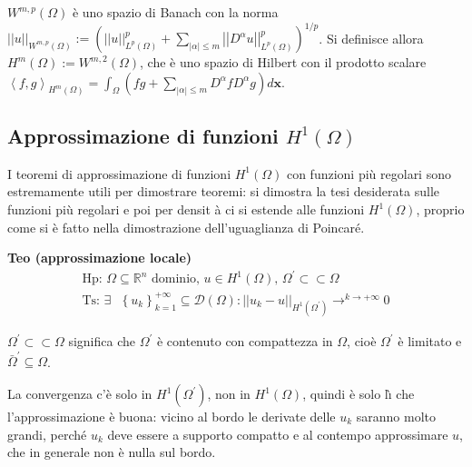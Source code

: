 \documentclass{article}
\begin{document}
$W^{m,p}\left( \Omega \right) $ \`{e} uno spazio di Banach con la norma $%
\left\vert \left\vert u\right\vert \right\vert _{W^{m,p}\left( \Omega
\right) }:=\left( \left\vert \left\vert u\right\vert \right\vert
_{L^{p}\left( \Omega \right) }^{p}+\sum_{\left\vert \alpha \right\vert \leq
m}\left\vert \left\vert D^{\alpha }u\right\vert \right\vert _{L^{p}\left(
\Omega \right) }^{p}\right) ^{1/p}$. Si definisce allora $H^{m}\left( \Omega
\right) :=W^{m,2}\left( \Omega \right) $, che \`{e} uno spazio di Hilbert
con il prodotto scalare $\left\langle f,g\right\rangle _{H^{m}\left( \Omega
\right) }=\int_{\Omega }\left( fg+\sum_{\left\vert \alpha \right\vert \leq
m}D^{\alpha }fD^{\alpha }g\right) d\mathbf{x}$.

\subsection{Approssimazione di funzioni $H^{1}\left( \Omega \right) $}

I teoremi di approssimazione di funzioni $H^{1}\left( \Omega \right) $ con
funzioni pi\`{u} regolari sono estremamente utili per dimostrare teoremi: si
dimostra la tesi desiderata sulle funzioni pi\`{u} regolari e poi per densit%
\`{a} ci si estende alle funzioni $H^{1}\left( \Omega \right) $, proprio
come si \`{e} fatto nella dimostrazione dell'uguaglianza di Poincar\'{e}.

\textbf{Teo (approssimazione locale)}%
\begin{gather*}
\text{Hp}\text{: }\Omega \subseteq 
\mathbb{R}
^{n}\text{ dominio, }u\in H^{1}\left( \Omega \right) \text{, }\Omega
^{\prime }\subset \subset \Omega \\
\text{Ts}\text{: }\exists \text{ }\left\{ u_{k}\right\} _{k=1}^{+\infty
}\subseteq \mathcal{D}\left( \Omega \right) :\left\vert \left\vert
u_{k}-u\right\vert \right\vert _{H^{1}\left( \Omega ^{\prime }\right)
}\rightarrow ^{k\rightarrow +\infty }0
\end{gather*}

$\Omega ^{\prime }\subset \subset \Omega $ significa che $\Omega ^{\prime }$ 
\`{e} contenuto con compattezza in $\Omega $, cio\`{e} $\Omega ^{\prime }$ 
\`{e} limitato e $\bar{\Omega}^{\prime }\subseteq \Omega $.

La convergenza c'\`{e} solo in $H^{1}\left( \Omega ^{\prime }\right) $, non
in $H^{1}\left( \Omega \right) $, quindi \`{e} solo l\`{\i} che
l'approssimazione \`{e} buona: vicino al bordo le derivate delle $u_{k}$
saranno molto grandi, perch\'{e} $u_{k}$ deve essere a supporto compatto e
al contempo approssimare $u$, che in generale non \`{e} nulla sul bordo.
\end{document}
